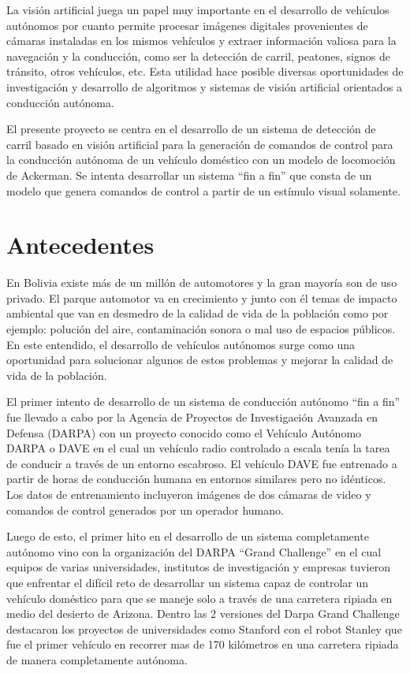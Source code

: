 \documentclass[12pt,letterpaper]{article}
\begin{document}
La visión artificial juega un papel muy importante en el desarrollo de vehículos autónomos por cuanto permite 
procesar imágenes digitales provenientes de cámaras instaladas en los mismos vehículos y extraer información 
valiosa para la navegación y la conducción, como ser la detección de carril, peatones, signos de tránsito, otros vehículos, 
etc. Esta utilidad hace posible diversas oportunidades de investigación y desarrollo de algoritmos y sistemas de visión 
artificial orientados a conducción autónoma.

El presente proyecto se centra en el desarrollo de un sistema de detección de carril basado en visión artificial para 
la generación de comandos de control para la conducción autónoma de un vehículo doméstico con un modelo de locomoción 
de Ackerman. Se intenta desarrollar un sistema “fin a fin” que consta de un modelo que genera comandos de control a 
partir de un estímulo visual solamente.

\section{Antecedentes}

En Bolivia existe más de un millón de automotores y la gran mayoría son de uso privado. El parque automotor va 
en crecimiento y junto con él temas de impacto ambiental que van en desmedro de la calidad de vida de la población 
como por ejemplo: polución del aire, contaminación sonora o mal uso de espacios públicos. En este entendido, el 
desarrollo de vehículos autónomos surge como una oportunidad para solucionar algunos de estos problemas y mejorar 
la calidad de vida de la población.

El primer intento de desarrollo de un sistema de conducción autónomo “fin a fin” fue llevado a cabo por la Agencia 
de Proyectos de Investigación Avanzada en Defensa (DARPA) con un proyecto conocido como el Vehículo Autónomo DARPA o 
DAVE en el cual un vehículo radio controlado a escala tenía la tarea de conducir a través de un entorno escabroso. 
El vehículo DAVE fue entrenado a partir de horas de conducción humana en entornos similares pero no idénticos. Los datos 
de entrenamiento incluyeron imágenes de dos cámaras de video y comandos de control generados por un operador humano. 

Luego de esto, el primer hito en el desarrollo de un sistema completamente autónomo vino con la organización del DARPA 
“Grand Challenge” en el cual equipos de varias universidades, institutos de investigación y empresas tuvieron que 
enfrentar el difícil reto de desarrollar un sistema capaz de controlar un vehículo doméstico para que se maneje solo a 
través de una carretera ripiada en medio del desierto de Arizona. Dentro las 2 versiones del Darpa Grand Challenge 
destacaron los proyectos de universidades como Stanford con el robot Stanley que fue el primer vehículo en recorrer 
mas de 170 kilómetros en una carretera ripiada de manera completamente autónoma. 
\end{document}
